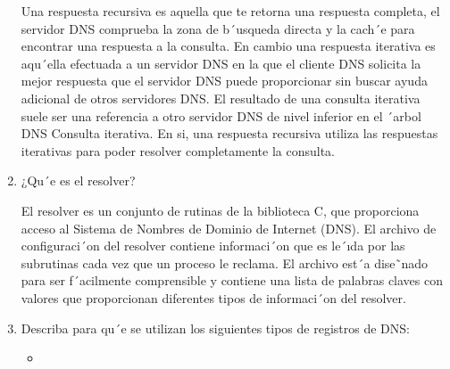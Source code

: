 \documentclass[a4paper,10pt]{article}
\begin{document}
\begin{enumerate}
        Una respuesta recursiva es aquella que te retorna una respuesta completa, el servidor DNS comprueba la zona de b´usqueda directa y la cach´e para encontrar una respuesta a la consulta. En cambio una respuesta iterativa es aqu´ella efectuada a un servidor DNS en la que el cliente DNS solicita la mejor respuesta que el servidor DNS puede proporcionar sin buscar ayuda adicional de otros servidores DNS. El resultado de una consulta iterativa suele ser una referencia a otro servidor DNS de nivel inferior en el ´arbol DNS Consulta iterativa.
        En si, una respuesta recursiva utiliza las respuestas iterativas para poder resolver completamente la consulta.
        
        \item ¿Qu´e es el resolver?
        
        El resolver es un conjunto de rutinas de la biblioteca C, que proporciona acceso al Sistema de Nombres de Dominio de Internet (DNS). El archivo de configuraci´on del resolver contiene informaci´on que es le´ıda por las subrutinas cada vez que un proceso le reclama. El archivo est´a dise˜nado para ser f´acilmente comprensible y contiene una lista de palabras claves con valores que proporcionan diferentes tipos de informaci´on del resolver.
        
        \item Describa para qu´e se utilizan los siguientes tipos de registros de DNS:
        
        \begin{itemize}
            \item 
        \end{itemize}
    \end{enumerate}
\end{document}
